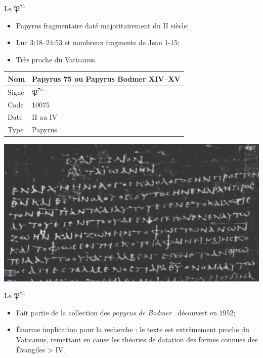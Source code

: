 \documentclass[11pt]{beamer}
\begin{document}
\begin{frame}{Le $\mathfrak{P}^{75}$}
\begin{block}{}
    \begin{itemize}
        \item Papyrus fragmentaire daté majoritairement du II\ieme{} siècle;
        \item Luc 3:18–24:53 et nombreux fragments de Jean 1-15;
        \item Très proche du Vaticanus.
    \end{itemize}
\end{block}
    \vfill
\begin{minipage}{.45\textwidth}
\begin{tabularx}{\textwidth}{l|X}
    \small
     Nom & Papyrus 75 ou Papyrus Bodmer XIV–XV \\
     \hline
     Signe & $\mathfrak{P}^{75}$ \\
     \hline
     Code & 10075\\
     \hline
     Date & II\ieme{} au IV\ieme{} \\
     \hline
     Type & Papyrus \\
\end{tabularx}
\end{minipage}
\hfill
\begin{minipage}{.45\textwidth}
    \includegraphics[scale=.2]{img/jn_1_1_p75.png}
\end{minipage}
    
\end{frame}


\begin{frame}{Le $\mathfrak{P}^{75}$}

    \begin{itemize}
        \item Fait partie de la collection \og des \textit{papyrus de Bodmer} \fg\ découvert en 1952;
        \item Énorme implication pour la recherche : le texte est extrêmement proche du Vaticanus, remettant en cause les théories de datation des formes connues des Évangiles > IV\ieme{}.
    \end{itemize}
\end{frame}
\end{document}
